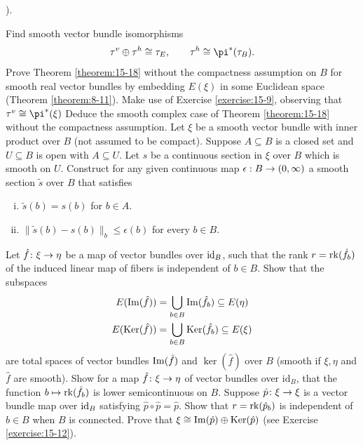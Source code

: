 \begin{enumerate}[\theexercise.1]
    ).\par
    Find smooth vector bundle isomorphisms
    \[
      \tau^v\oplus \tau^h \simee \tau_E, \qquad \tau^h\simee \pi^*(\tau_B).
    \]
  \NewItem Prove Theorem \ref{theorem:15-18} without the compactness assumption
    on $B$ for smooth real vector bundles by embedding $E(\xi)$ in some Euclidean space (Theorem \ref{theorem:8-11}).
    Make use of Exercise \ref{exercise:15-9}, observing that $\tau^v\simee \pi^*(\xi)$
    Deduce the smooth complex case of Theorem \ref{theorem:15-18} without the compactness assumption.
  \NewItem Let $\xi$ be a smooth vector bundle with inner product over $B$ (not assumed to be compact). Suppose $A \subseteq  B$ is a closed set and $U \subseteq  B$ is open with $A \subseteq  U$. Let $s$ be a continuous section in $\xi$ over $B$ which is smooth on $U$. Construct for any given continuous map $\epsilon  : B \rightarrow  ( {0,\infty })$ a smooth section $\tilde{s}$ over $B$ that satisfies
    \begin{enumerate}[(i)]
      \item $\tilde{s}( b)  = s( b)$ for $b \in  A$.
      \item $\| \tilde{s}( b) - s( b) {\| }_{b} \leq  \epsilon ( b)$ for every $b \in  B$.
    \end{enumerate}
  \NewItem Let $\hat{f}\colon \xi  \rightarrow  \eta$ be a map of vector bundles over ${\mathrm{id}}_{B}$, such that the rank $r = \mathrm{rk}( {\hat{f}}_{b})$ of the induced linear map of fibers is independent of $b \in  B$. Show that the subspaces
    \[
    \begin{aligned}
      E( {\operatorname{Im}( \hat{f}) })  & = \bigcup_{b \in  B}\operatorname{Im}( {\hat{f}}_{b})  \subseteq  E( \eta ) \\
      E( {{\operatorname{Ker}}( \hat{f}) })  & = \bigcup_{b \in  B}{\operatorname{Ker}}( {\hat{f}}_{b})  \subseteq  E( \xi )
    \end{aligned}
    \]
    are total spaces of vector bundles $\operatorname{Im}( \hat{f})$ and ${\ker}( \hat{f})$ over $B$ (smooth if $\xi,\eta$ and $\hat{f}$ are smooth).
  \NewItem Show for a map $\hat{f}\colon \xi  \rightarrow  \eta$ of vector bundles over ${\mathrm{{id}}}_{B}$, that the function $b \mapsto  \mathrm{rk}( {\hat{f}}_{b})$ is lower semicontinuous on $B$.
  \NewItem Suppose $\hat{p}\colon \xi  \rightarrow  \xi$ is a vector bundle map over ${\mathrm{id}}_{B}$ satisfying $\hat{p} \circ  \hat{p} = \hat{p}$. Show that $r = \mathrm{rk}( {\hat{p}}_{b})$ is independent of $b \in  B$ when $B$ is connected. Prove that $\xi  \cong  \operatorname{Im}( \hat{p})  \oplus  {\operatorname{Ker}}( \hat{p})$ (see Exercise \ref{exercise:15-12}).

\end{enumerate}
